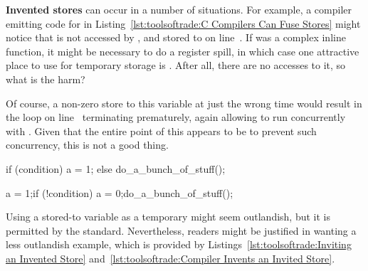 \begin{lineref}
{\bf Invented stores} can occur in a number of situations.
For example, a compiler emitting code for  in
Listing~\ref{lst:toolsoftrade:C Compilers Can Fuse Stores}
might notice that  is not accessed by
, and stored to on line~.
If  was a complex inline function, it might be
necessary to do a register spill, in which case one attractive
place to use for temporary storage is .
After all, there are no accesses to it, so what is the harm?

Of course, a non-zero store to this variable at just the wrong time
would result in the  loop on
line~ terminating
prematurely, again allowing  to run
concurrently with .
Given that the entire point of this  appears to be to
prevent such concurrency, this is not a good thing.
\end{lineref}

\begin{listing}[tbp]
\begin{linelabel}
\begin{VerbatimL}[commandchars=\\\{\}]
if (condition)
	a = 1;
else
	do_a_bunch_of_stuff();
\end{VerbatimL}
\end{linelabel}
\caption{Inviting an Invented Store}
\label{lst:toolsoftrade:Inviting an Invented Store}
\end{listing}

\begin{listing}[tbp]
\begin{linelabel}
\begin{VerbatimL}[commandchars=\\\[\]]
a = 1;
if (!condition) {
	a = 0;
	do_a_bunch_of_stuff();
}
\end{VerbatimL}
\end{linelabel}
\caption{Compiler Invents an Invited Store}
\label{lst:toolsoftrade:Compiler Invents an Invited Store}
\end{listing}

Using a stored-to variable as a temporary might seem outlandish,
but it is permitted by the standard.
Nevertheless, readers might be justified in wanting a less
outlandish example, which is provided by
Listings~\ref{lst:toolsoftrade:Inviting an Invented Store}
and~\ref{lst:toolsoftrade:Compiler Invents an Invited Store}.

